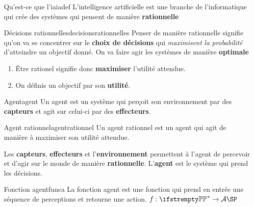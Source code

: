 
\begin{definition}{Qu'est-ce que l'ia}{iadef}
    L'intelligence artificielle est une branche de l'informatique qui crée des systèmes 
    qui pensent de manière \textbf{rationnelle}
\end{definition}

\begin{definition}{Décisions rationnelles}{decisionsrationnelles}
    Penser de manière rationnelle signifie qu'on va se concentrer sur le \textbf{choix de décisions}
    qui \textit{maximisent la probabilité} d'atteindre un objectif donné. On va faire agir les systèmes de 
    manière \textbf{optimale}
\end{definition}
\begin{remarks}\leavevmode
\begin{enumerate}
    \item     Être rationel signifie donc \textbf{maximiser} l'utilité attendue.
    \item On définis un objectif par son \textbf{utilité}.
\end{enumerate}
\end{remarks}

\begin{definition}{Agent}{agent}
    Un agent est un système qui perçoit son environnement par des \textbf{capteurs} et agit sur celui-ci par des \textbf{effecteurs}.
\end{definition}

\begin{definition}{Agent rationnel}{agentrationnel}
    Un agent rationnel est un agent qui agit de manière à maximiser son utilité attendue. 
\end{definition}

\begin{remark}\leavevmode
    Les \textbf{capteurs}, \textbf{effecteurs} et l'\textbf{environnement} permettent à l'agent 
    de percevoir et d'agir sur le monde de manière \textbf{rationnelle}. L'\textbf{agent} est le système qui prend les décisions.
\end{remark}

\begin{definition}{Fonction agent}{funca}
    La fonction agent est une fonction qui prend en entrée une séquence de perceptions et retourne une action.
    \begin{math}
        f: \PP^* \rightarrow \SA \SP
    \end{math}
\end{definition}

